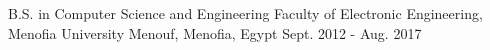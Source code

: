 

\begin{cventries}

  \cventry
    {B.S. in Computer Science and Engineering} %
    {Faculty of Electronic Engineering, Menofia University} %
    {Menouf, Menofia, Egypt} %
    {Sept. 2012 - Aug. 2017} %
    {
      \begin{cvitems} %
      \end{cvitems}
    }
\end{cventries}
